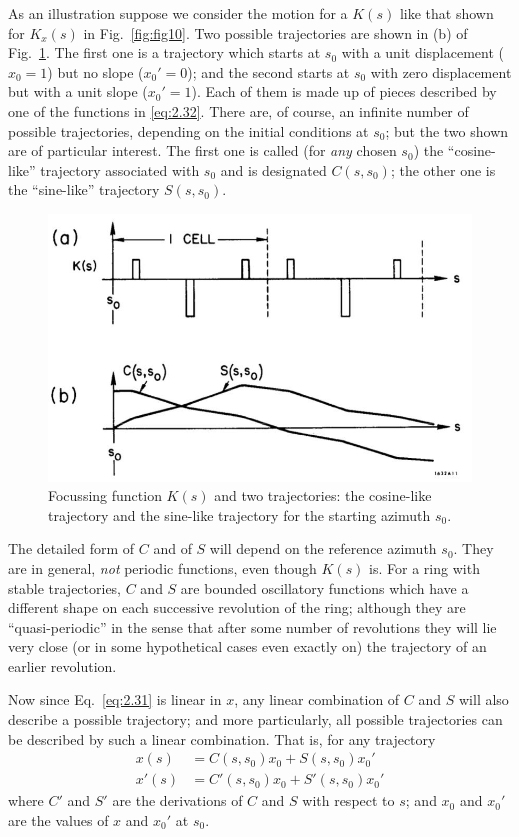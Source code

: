 As an illustration suppose we consider the motion for a $K(s)$ like that shown for $K_x(s)$ in Fig.~\ref{fig:fig10}. Two possible trajectories are shown in (b) of Fig.~\ref{fig:fig11}. The first one is a trajectory which starts at $s_0$ with a unit displacement ($x_0 = 1$) but no slope ($x_0' = 0$); and the second starts at $s_0$ with zero displacement but with a unit slope ($x_0' = 1$). Each of them is made up of pieces described by one of the functions in \eqref{eq:2.32}. There are, of course, an infinite number of possible trajectories, depending on the initial conditions at $s_0$; but the two shown are of particular interest. The first one is called (for \textit{any} chosen $s_0$) the “cosine-like” trajectory associated with $s_0$ and is designated $C(s,s_0)$; the other one is the “sine-like” trajectory $S(s,s_0)$.

\begin{figure}[!htb]
	\centering
	\includegraphics[width=0.7\linewidth]{./Figuras/fig11.jpeg}
	\caption{Focussing function $K(s)$ and two trajectories: the cosine-like trajectory and the sine-like trajectory for the starting azimuth $s_0$.}
	\label{fig:fig11}
\end{figure}

The detailed form of $C$ and of $S$ will depend on the reference azimuth $s_0$. They are in general, \textit{not} periodic functions, even though $K(s)$ is. For a ring with stable trajectories, $C$ and $S$ are bounded oscillatory functions which have a different shape on each successive revolution of the ring; although they are ``quasi-periodic'' in the sense that after some number of revolutions they will lie very close (or in some hypothetical cases even exactly on) the trajectory of an earlier revolution.

Now since Eq.~\eqref{eq:2.31} is linear in $x$, any linear combination of $C$ and $S$ will also describe a possible trajectory; and more particularly, all possible trajectories can be described by such a linear combination. That is, for any trajectory
\begin{align}
	x(s) &= C(s,s_0)x_0 + S(s,s_0)x_0'\\
	x'(s) &= C'(s,s_0)x_0 + S'(s,s_0)x_0'
\end{align}
where $C'$ and $S'$ are the derivations of $C$ and $S$ with respect to $s$; and $x_0$ and $x_0'$ are the values of $x$ and $x_0'$ at $s_0$.

